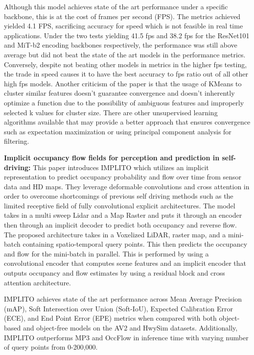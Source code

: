 \documentclass{article}
\theoremstyle{plain}
\theoremstyle{definition}
\theoremstyle{remark}
\begin{document}
\hspace{20pt} Although this model achieves state of the art performance under a specific backbone, this is at the cost of frames per second (FPS). The metrics achieved yielded 4.1 FPS, sacrificing accuracy for speed which is not feasible in real time applications. Under the two tests yielding 41.5 fps and 38.2 fps for the ResNet101 and MiT-b2 encoding backbones respectively, the performance was still above average but did not beat the state of the art models in the performance metrics. Conversely, despite not beating other models in metrics in the higher fps testing, the trade in speed causes it to have the best accuracy to fps ratio out of all other high fps models. Another criticism of the paper is that the usage of KMeans to cluster similar features doesn’t guarantee convergence and doesn’t inherently optimize a function due to the possibility of ambiguous features and improperly selected k values for cluster size. There are other unsupervised learning algorithms available that may provide a better approach that ensures convergence such as expectation maximization or using principal component analysis for filtering.

\textbf{Implicit occupancy flow fields for perception and prediction in self-driving: }
This paper introduces IMPLITO which utilizes an implicit representation to predict occupancy probability and flow over time from sensor data and HD maps. They leverage deformable convolutions and cross attention in order to overcome shortcomings of previous self driving methods such as the limited receptive field of fully convolutional explicit architectures. The model takes in a multi sweep Lidar and a Map Raster and puts it through an encoder then through an implicit decoder to predict both occupancy and reverse flow.
The proposed architecture takes in a Voxelized LiDAR, raster map, and a mini-batch containing spatio-temporal query points. This then predicts the occupancy and flow for the mini-batch in parallel. This is performed by using a convolutional encoder that computes scene features and an implicit encoder that outputs occupancy and flow estimates by using a residual block and cross attention architecture. 

\hspace{20pt} IMPLITO achieves state of the art performance across Mean Average Precision (mAP), Soft Intersection over Union (Soft-IoU), Expected Calibration Error (ECE), and End Point Error (EPE) metrics when compared with both object-based and object-free models on the AV2 and HwySim datasets. Additionally, IMPLITO outperforms MP3 and OccFlow in inference time with varying number of query points from 0-200,000.
\end{document}
